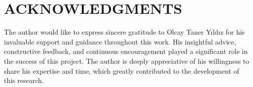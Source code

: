 \documentclass[conference]{IEEEtran}
\begin{document}
\section*{ACKNOWLEDGMENTS}
The author would like to express sincere gratitude to Olcay Taner Yıldız for his invaluable support and guidance throughout this work. His insightful advice, constructive feedback, and continuous encouragement played a significant role in the success of this project. The author is deeply appreciative of his willingness to share his expertise and time, which greatly contributed to the development of this research.



\end{document}
